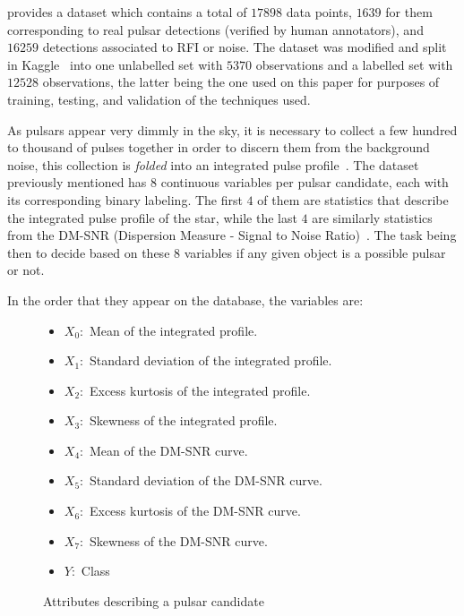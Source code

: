 \documentclass[journal]{IEEEtran}
\begin{document}
\citet{pulsar:dataset:lyon} provides a dataset which contains a total of $17898$
data points, $1639$ for them corresponding to real pulsar detections (verified
by human annotators), and $16259$ detections associated to RFI or noise. The
dataset was modified and split in Kaggle~\cite{pulsar:dataset:kaggle} into one
unlabelled set with $5370$ observations and a labelled set with $12528$
observations, the latter being the one used on this paper for purposes of
training, testing, and validation of the techniques used.

As pulsars appear very dimmly in the sky, it is necessary to collect a few
hundred to thousand of pulses together in order to discern them from the
background noise, this collection is \textit{folded} into an integrated pulse
profile~\cite{pulsar:importance:kramer}. The dataset previously mentioned has 8
continuous variables per pulsar candidate, each with its corresponding binary
labeling. The first $4$ of them are statistics that describe the integrated
pulse profile of the star, while the last $4$ are similarly statistics from the
DM-SNR (Dispersion Measure - Signal to Noise
Ratio)~\cite{pulsar:dataset:explanation:lyon}. The task being then to decide
based on these 8 variables if any given object is a possible pulsar or not.

In the order that they appear on the database, the variables are:

\begin{figure}[ht]
    \begin{itemize}
        \item $X_0:$ Mean of the integrated profile.
        \item $X_1:$ Standard deviation of the integrated profile.
        \item $X_2:$ Excess kurtosis of the integrated profile.
        \item $X_3:$ Skewness of the integrated profile.
        \item $X_4:$ Mean of the DM-SNR curve.
        \item $X_5:$ Standard deviation of the DM-SNR curve.
        \item $X_6:$ Excess kurtosis of the DM-SNR curve.
        \item $X_7:$ Skewness of the DM-SNR curve.
        \item $Y:$ Class 
    \end{itemize}
    \caption{Attributes describing a pulsar candidate\label{fig:variables}}
\end{figure}
\end{document}
